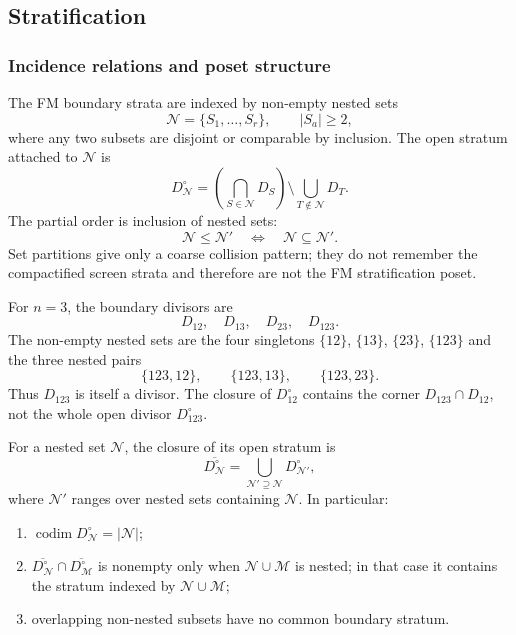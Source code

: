 \subsection{Stratification}

\subsubsection{Incidence relations and poset structure}

\begin{definition}\label{def:stratification-poset}
The FM boundary strata are indexed by non-empty nested sets
\[
\mathcal N=\{S_1,\ldots,S_r\},\qquad |S_a|\geq2,
\]
where any two subsets are disjoint or comparable by inclusion. The
open stratum attached to $\mathcal N$ is
\[
D_{\mathcal N}^{\circ}
=
\left(\bigcap_{S\in\mathcal N}D_S\right)
\setminus
\bigcup_{T\notin\mathcal N}D_T .
\]
The partial order is inclusion of nested sets:
\[
\mathcal N\leq \mathcal N'
\quad\Longleftrightarrow\quad
\mathcal N\subseteq\mathcal N'.
\]
Set partitions give only a coarse collision pattern; they do not
remember the compactified screen strata and therefore are not the FM
stratification poset.
\end{definition}

\begin{example}[Poset for \texorpdfstring{$n=3$}{n=3}]\label{ex:poset-n3}
For $n=3$, the boundary divisors are
\[
D_{12},\quad D_{13},\quad D_{23},\quad D_{123}.
\]
The non-empty nested sets are the four singletons
$\{12\}$, $\{13\}$, $\{23\}$, $\{123\}$ and the three nested pairs
\[
\{123,12\},\qquad \{123,13\},\qquad \{123,23\}.
\]
Thus $D_{123}$ is itself a divisor. The closure of $D_{12}^{\circ}$
contains the corner $D_{123}\cap D_{12}$, not the whole open divisor
$D_{123}^{\circ}$.
\end{example}

\begin{theorem}\label{thm:closure-relations}
For a nested set $\mathcal N$, the closure of its open stratum is
\[
\overline{D_{\mathcal N}^{\circ}}
=
\bigcup_{\mathcal N'\supseteq \mathcal N}
D_{\mathcal N'}^{\circ},
\]
where $\mathcal N'$ ranges over nested sets containing $\mathcal N$.
In particular:
\begin{enumerate}
\item $\operatorname{codim}D_{\mathcal N}^{\circ}=|\mathcal N|$;
\item $\overline{D_{\mathcal N}^{\circ}}\cap
\overline{D_{\mathcal M}^{\circ}}$ is nonempty only when
$\mathcal N\cup\mathcal M$ is nested; in that case it contains the
stratum indexed by $\mathcal N\cup\mathcal M$;
\item overlapping non-nested subsets have no common boundary stratum.
\end{enumerate}
\end{theorem}

